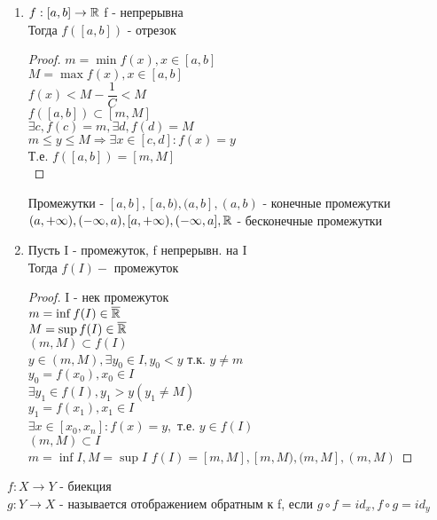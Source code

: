 \begin{consequence}
\begin{enumerate}
\begin{proof}
		\end{proof}
		\item $ f: [a, b]  \rightarrow \mathbb{R} $ f - непрерывна \\
		Тогда $ f([a, b] ) $ - отрезок \\
		\begin{proof}
			$ m = \min f(x), x \in [a, b] $ \\
			$ M = \max f(x), x \in [a, b]  $  \\
			$f(x) < M - \dfrac{1}{C} < M $ \\
			$ f( [a, b] ) \subset{[m, M]} $ \\
			$ \exists c, f(c) = m, \exists d, f(d) = M $ \\
			$ m \leq y \leq M \Rightarrow \exists x \in [c,d] : f(x) = y $ \\
			Т.е. $ f([a, b] ) = [m, M] $ \\ 
		\end{proof}
		Промежутки - $ [a,b], [a, b), (a, b], (a, b) $ - конечные промежутки\\
		$ (a, + \infty), (-\infty, a), [a, + \infty), (-\infty, a], \mathbb{R} $ - бесконечные промежутки \\
		\item Пусть I - промежуток,  f непрерывн. на I \\
		Тогда $ f(I) - $ промежуток
		\begin{proof}
			I - нек промежуток \\
			$ m = \inf f(I) \in \overline{\mathbb{R}} $ \\
			$ M = \sup f(I)  \in \overline{\mathbb{R}} $ \\
			$ (m, M) \subset f(I) $ \\
			$ y \in (m, M) , \exists y_0 \in I, y_0 < y $ т.к. $ y \neq m $ \\
			$ y_0 = f(x_0), x_0 \in I $ \\
			$ \exists y_1 \in f(I), y_1 > y (y_1 \neq M)$ \\
			$ y_1 = f(x_1), x_1 \in I$\\
			$ \exists x \in [x_0, x_n] : f(x) = y,$ т.е. $ y \in f(I) $ \\
			$ (m, M) \subset I $\\
			$ m = \inf I, M = \sup I $
			$ f(I) = [m,M], [m, M), (m, M], (m, M) $
		\end{proof}
	\end{enumerate}
\end{consequence}

\noindent
$ f : X \rightarrow Y $ - биекция \\
$ g : Y \rightarrow X $ - называется отображением обратным к f, если 
$ g \circ f = id_x, f \circ g = id_y $

